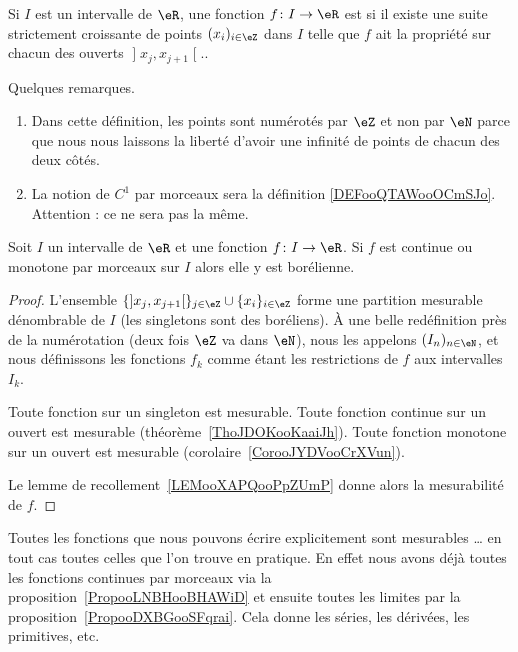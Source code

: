 \begin{definition}
	Si \( I\) est un intervalle de \( \eR\), une fonction \( f\colon I\to \eR\) est  si il existe une suite strictement croissante de points \( (x_i)_{i\in \eZ}\) dans \( I\) telle que \( f\) ait la propriété sur chacun des ouverts \( \mathopen] x_j ,x_{j+1} \mathclose[.\).
\end{definition}

\begin{remark}
	Quelques remarques.
	\begin{enumerate}
		\item
		      Dans cette définition, les points sont numérotés par \( \eZ\) et non par \( \eN\) parce que nous nous laissons la liberté d'avoir une infinité de points de chacun des deux côtés.

		\item
		      La notion de \( C^1\) par morceaux sera la définition \ref{DEFooQTAWooOCmSJo}. Attention : ce ne sera pas la même.
	\end{enumerate}
\end{remark}

\begin{proposition}     \label{PropooLNBHooBHAWiD}
	Soit \( I\) un intervalle de \( \eR\) et une fonction \( f\colon I\to \eR\). Si \( f\) est continue ou monotone par morceaux sur \( I\) alors elle y est borélienne.
\end{proposition}

\begin{proof}
	L'ensemble \( \{  \mathopen] x_j , x_{j+1} \mathclose[  \}_{j\in \eZ}\cup\{ x_i \}_{i\in \eZ}\) forme une partition mesurable dénombrable de \( I\) (les singletons sont des boréliens). À une belle redéfinition près de la numérotation (deux fois \( \eZ\) va dans \( \eN\)), nous les appelons \( (I_n)_{n\in \eN}\), et nous définissons les fonctions \( f_k\) comme étant les restrictions de \( f\) aux intervalles \( I_k\).

	Toute fonction sur un singleton est mesurable. Toute fonction continue sur un ouvert est mesurable (théorème~\ref{ThoJDOKooKaaiJh}). Toute fonction monotone sur un ouvert est mesurable (corolaire~\ref{CorooJYDVooCrXVun}).

	Le lemme de recollement~\ref{LEMooXAPQooPpZUmP} donne alors la mesurabilité de \( f\).
\end{proof}

\begin{normaltext}
	Toutes les fonctions que nous pouvons écrire explicitement sont mesurables \ldots{} en tout cas toutes celles que l'on trouve en pratique. En effet nous avons déjà toutes les fonctions continues par morceaux via la proposition~\ref{PropooLNBHooBHAWiD} et ensuite toutes les limites par la proposition~\ref{PropooDXBGooSFqrai}. Cela donne les séries, les dérivées, les primitives, etc.
\end{normaltext}
